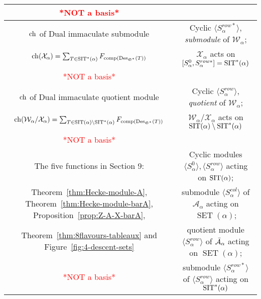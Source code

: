 \documentclass[12pt,letterpaper]{amsart}
\theoremstyle{definition}
\DeclareMathOperator{\comp}{comp}
\newcommand{\dI}{\mathfrak{S}^*}
\DeclareMathOperator{\Des}{Des}
\newcommand{\SET}{\ensuremath{\operatorname{SET}}} \newcommand{\NSET}{\ensuremath{\operatorname{NSET}}}\newcommand{\SRCT}{\ensuremath{\operatorname{SRCT}}}
\begin{document}
\begin{table}[htbp]
\begin{center}
{\begin{tabular}{|c|c|}
\textcolor{red}{*NOT a basis*}    &  \\ 
\hline
$\operatorname{\mathrm{ch}}$ of Dual immaculate submodule& Cyclic $\langle  S^{row*}_\alpha \rangle$, \textit{submodule} of $\mathcal{W}_\alpha$; 
\T\\[2pt]
$\chr(\mathcal{X}_\alpha)= \sum_{T\in \SIT^*(\alpha)} F_{\comp(\Des_{\dI}(T))}$ 
& $\mathcal{X}_\alpha$ acts on $[S^0_\alpha, S^{row*}_\alpha]=\operatorname{SIT}^*(\alpha)$\\[2pt]
\textcolor{red}{*NOT a basis*}    &  \\ [2pt]\hline
$\operatorname{\mathrm{ch}}$ of Dual immaculate quotient module& Cyclic $\langle S^{row}_\alpha\rangle$, \textit{quotient} of $\mathcal{W}_\alpha$;
\T\\[2pt]
$\chr(\mathcal{W}_\alpha/\mathcal{X}_\alpha)
= \sum_{T\in \SIT(\alpha)\setminus \SIT^*(\alpha)} F_{\comp(\Des_{\dI}(T))}$ 
& $\mathcal{W}_\alpha/\mathcal{X}_\alpha$ acts on $\operatorname{SIT}(\alpha)\setminus\operatorname{SIT}^*(\alpha)$\\[2pt]
\textcolor{red}{*NOT a basis*}     &  \\ [2pt]\hline
The five functions in Section 9: & Cyclic modules  $\langle S^0_\alpha \rangle, \langle S^{row}_\alpha \rangle$ acting on $\operatorname{SIT}(\alpha)$;\\[2pt]
 Theorem~\ref{thm:Hecke-module-A}, Theorem~\ref{thm:Hecke-module-barA}, Proposition~\ref{prop:Z-A-X-barA},& submodule $\langle S^{col}_\alpha\rangle$ of $\mathcal{A}_\alpha$ acting on $\SET(\alpha)$; \\[2pt]
Theorem~\ref{thm:8flavours-tableaux} and Figure~\ref{fig:4-descent-sets}& quotient module $\langle S^{row}_\alpha \rangle$ of $\operatorname{\bar{\mathcal{A}}}_\alpha$ acting on $\SET(\alpha)$;\\[2pt]
 \textcolor{red}{*NOT a basis*}  & submodule  $\langle S^{row*}_\alpha\rangle$ of $ \langle  S^{row}_\alpha \rangle$ acting on $\operatorname{SIT}^*(\alpha)$\\[2pt]\hline
\end{tabular}
}    
\end{center}
\label{table:QSymfunctions-modules}
\end{table}



\end{document}
